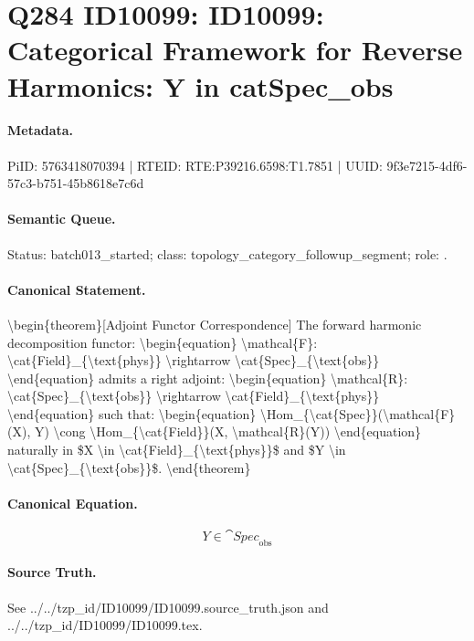 \section*{Q284 ID10099: ID10099: Categorical Framework for Reverse Harmonics: Y in catSpec\_obs}
\paragraph{Metadata.}
PiID: 5763418070394 | RTEID: RTE:P39216.6598:T1.7851 | UUID: 9f3e7215-4df6-57c3-b751-45b8618e7c6d

\paragraph{Semantic Queue.}
Status: batch013\_started; class: topology\_category\_followup\_segment; role: .

\paragraph{Canonical Statement.}
\textbackslash{}begin\{theorem\}[Adjoint Functor Correspondence] The forward harmonic decomposition functor: \textbackslash{}begin\{equation\} \textbackslash{}mathcal\{F\}: \textbackslash{}cat\{Field\}\_\{\textbackslash{}text\{phys\}\} \textbackslash{}rightarrow \textbackslash{}cat\{Spec\}\_\{\textbackslash{}text\{obs\}\} \textbackslash{}end\{equation\} admits a right adjoint: \textbackslash{}begin\{equation\} \textbackslash{}mathcal\{R\}: \textbackslash{}cat\{Spec\}\_\{\textbackslash{}text\{obs\}\} \textbackslash{}rightarrow \textbackslash{}cat\{Field\}\_\{\textbackslash{}text\{phys\}\} \textbackslash{}end\{equation\} such that: \textbackslash{}begin\{equation\} \textbackslash{}Hom\_\{\textbackslash{}cat\{Spec\}\}(\textbackslash{}mathcal\{F\}(X), Y) \textbackslash{}cong \textbackslash{}Hom\_\{\textbackslash{}cat\{Field\}\}(X, \textbackslash{}mathcal\{R\}(Y)) \textbackslash{}end\{equation\} naturally in \$X \textbackslash{}in \textbackslash{}cat\{Field\}\_\{\textbackslash{}text\{phys\}\}\$ and \$Y \textbackslash{}in \textbackslash{}cat\{Spec\}\_\{\textbackslash{}text\{obs\}\}\$. \textbackslash{}end\{theorem\}

\paragraph{Canonical Equation.}
\[
Y \in \cat{Spec}_{\text{obs}}
\]

\paragraph{Source Truth.}
See ../../tzp\_id/ID10099/ID10099.source\_truth.json and ../../tzp\_id/ID10099/ID10099.tex.
